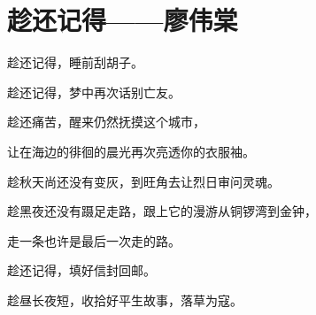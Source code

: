 \section{趁还记得——廖伟棠}

趁还记得，睡前刮胡子。

趁还记得，梦中再次话别亡友。

趁还痛苦，醒来仍然抚摸这个城市，

让在海边的徘徊的晨光再次亮透你的衣服袖。

趁秋天尚还没有变灰，到旺角去让烈日审问灵魂。

趁黑夜还没有蹑足走路，跟上它的漫游从铜锣湾到金钟，

走一条也许是最后一次走的路。

趁还记得，填好信封回邮。

趁昼长夜短，收拾好平生故事，落草为寇。

